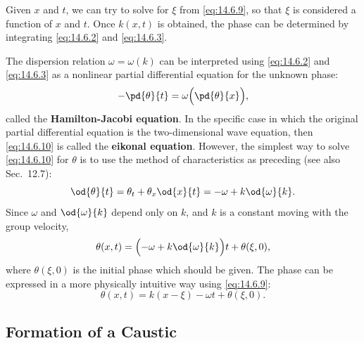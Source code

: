 Given $x$ and $t$, we can try to solve for $\xi$ from \eqref{eq:14.6.9}, so that $\xi$ is considered a function of $x$ and $t$.  Once $k(x,t)$ is obtained, the phase can be determined by integrating \eqref{eq:14.6.2} and \eqref{eq:14.6.3}.

The dispersion relation $\omega = \omega(k)$ can be interpreted using \eqref{eq:14.6.2} and \eqref{eq:14.6.3} as a nonlinear partial differential equation for the unknown phase:
\begin{equation}
\label{eq:14.6.10}
-\pd{\theta}{t} = \omega\Bigl(\pd{\theta}{x}\Bigr),
\end{equation}
called the \textbf{Hamilton-Jacobi equation}.  In the specific case in which the original partial differential equation is the two-dimensional wave equation, then \eqref{eq:14.6.10} is called the \textbf{eikonal equation}.  However, the simplest way to solve \eqref{eq:14.6.10} for $\theta$ is to use the method of characteristics as preceding (see also Sec.~12.7):
\[
\od{\theta}{t} = \theta_t + \theta_x\od{x}{t} = -\omega + k\od{\omega}{k}.
\]
Since $\omega$ and $\od{\omega}{k}$ depend only on $k$, and $k$ is a constant moving with the group velocity,
\[
\theta(x,t) = \Bigl(-\omega + k\od{\omega}{k}\Bigr)t + \theta(\xi,0),
\]
where $\theta(\xi,0)$ is the initial phase which should be given.  The phase can be expressed in a more physically intuitive way using \eqref{eq:14.6.9}:
\[
\theta(x,t) = k(x - \xi) - \omega t + \theta(\xi,0).
\]

\subsection{Formation of a Caustic}
\label{sec:caustic-formation}


